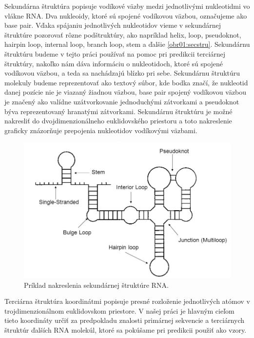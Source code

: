 \indent Sekundárna štruktúra popisuje vodíkové väzby medzi jednotlivými nukleotidmi vo vlákne RNA. Dva nukleoidy, ktoré sú spojené vodíkovou väzbou, označujeme ako base pair. Vďaka spájaniu jednotlivých nukleotidov vieme v sekundárnej štruktúre pozorovať rôzne podštruktúry, ako napríklad helix, loop, pseudoknot, hairpin loop, internal loop, branch loop, stem a ďalšie \autoref{obr01:secstru}. Sekundárnu štruktúru budeme v tejto práci používať na pomoc pri predikcii terciárnej štruktúry, nakoľko nám dáva informáciu o nukleotidoch, ktoré sú spojené vodíkovou väzbou, a teda sa nachádzajú blízko pri sebe. Sekundárnu štruktúru molekuly budeme reprezentovať ako textový súbor, kde bodka značí, že nukleotid danej pozície nie je viazaný žiadnou väzbou, base pair spojený vodíkovou väzbou je značený ako valídne uzátvorkovanie jednoduchými zátvorkami a pseudoknot býva reprezentovaný hranatými zátvorkami.  Sekundárnu štruktúru je možné nakresliť do dvojdimenzionálneho euklidovského priestoru a toto nakreslenie graficky znázorňuje prepojenia nukleotidov vodíkovými väzbami. 


\begin{figure}%
\includegraphics[width=\textwidth]{../img/secondary_structure}
\caption{Príklad nakreslenia sekundárnej štruktúre RNA. \cite{Eddy04}}
\label{obr01:secstru}
\end{figure}


\indent Terciárna štruktúra koordinátmi popisuje presné rozloženie jednotlivých atómov v trojdimenzionálnom euklidovskom priestore. V našej práci je hlavným cieľom tieto koordináty určiť za predpokladu znalosti primárnej sekvencie a terciárnych štruktúr ďalších RNA molekúl, ktoré sa pokúšame pri predikcii použiť ako vzory. 


